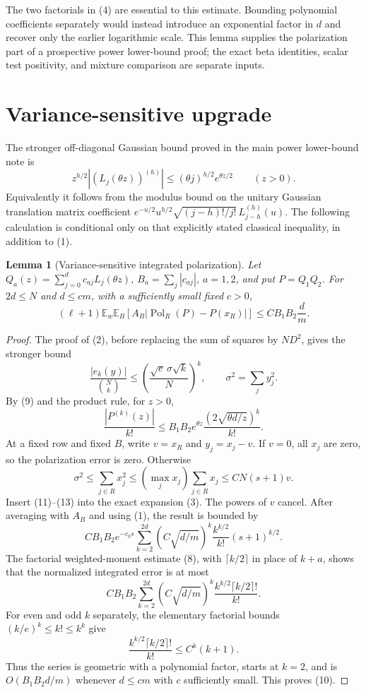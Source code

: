 \documentclass[11pt]{article}
\newtheorem{lemma}{Lemma}
\newcommand{\E}{\mathbb E}
\begin{document}
The two factorials in (4) are essential to this estimate. Bounding
polynomial coefficients separately would instead introduce an
exponential factor in $d$ and recover only the earlier logarithmic
scale. This lemma supplies the polarization part of a prospective
power lower-bound proof; the exact beta identities, scalar test
positivity, and mixture comparison are separate inputs.

\section*{Variance-sensitive upgrade}
The stronger off-diagonal Gaussian bound proved in the main power
lower-bound note is
\[
 z^{h/2}|(L_j(\theta z))^{(h)}|
 \le(\theta j)^{h/2}e^{\theta z/2}\qquad(z>0).
\tag{9}
\]
Equivalently it follows from the modulus bound on the unitary Gaussian
translation matrix coefficient
$e^{-u/2}u^{h/2}\sqrt{(j-h)!/j!}\,L_{j-h}^{(h)}(u)$.
The following calculation is conditional only on that explicitly stated
classical inequality, in addition to (1).

\begin{lemma}[Variance-sensitive integrated polarization]
Let $Q_a(z)=\sum_{j=0}^d c_{aj}L_j(\theta z)$,
$B_a=\sum_j|c_{aj}|$, $a=1,2$, and put $P=Q_1Q_2$.
For $2d\le N$ and $d\le c m$, with a sufficiently small fixed $c>0$,
\[
 (\ell+1)\E_w\E_B\left[A_B
 |\operatorname{Pol}_R(P)-P(x_R)|\right]
 \le C B_1B_2\frac d m.
\tag{10}
\]
\end{lemma}
\begin{proof}
The proof of (2), before replacing the sum of squares by $ND^2$,
gives the stronger bound
\[
 \frac{|e_k(y)|}{\binom Nk}
 \le\left(\frac{\sqrt e\,\sigma\sqrt k}{N}\right)^k,
 \qquad \sigma^2=\sum_jy_j^2.
\tag{11}
\]
By (9) and the product rule, for $z>0$,
\[
 \frac{|P^{(k)}(z)|}{k!}
 \le B_1B_2e^{\theta z}
       \frac{(2\sqrt{\theta d/z})^k}{k!}.
\tag{12}
\]
At a fixed row and fixed $B$, write $v=x_R$ and $y_j=x_j-v$.
If $v=0$, all $x_j$ are zero, so the polarization error is zero.
Otherwise
\[
 \sigma^2\le\sum_{j\in R}x_j^2
 \le (\max_jx_j)\sum_{j\in R}x_j
 \le C N(s+1)v.
\tag{13}
\]
Insert (11)--(13) into the exact expansion (3). The powers of $v$
cancel. After averaging with $A_B$ and using (1), the result is bounded
by
\[
 C B_1B_2e^{-c_0s}\sum_{k=2}^{2d}
 \left(C\sqrt{d/m}\right)^k
      \frac{k^{k/2}}{k!}(s+1)^{k/2}.
\]
The factorial weighted-moment estimate (8), with
$\lceil k/2\rceil$ in place of $k+a$, shows that the normalized
integrated error is at most
\[
 C B_1B_2\sum_{k=2}^{2d}
 \left(C\sqrt{d/m}\right)^k
       \frac{k^{k/2}\lceil k/2\rceil!}{k!}.
\]
For even and odd $k$ separately, the elementary factorial bounds
$(k/e)^k\le k!\le k^k$ give
\[
 \frac{k^{k/2}\lceil k/2\rceil!}{k!}
 \le C^k(k+1).
\]
Thus the series is geometric with a polynomial factor, starts at
$k=2$, and is $O(B_1B_2d/m)$ whenever $d\le c m$ with $c$ sufficiently
small. This proves (10).
\end{proof}
\end{document}
